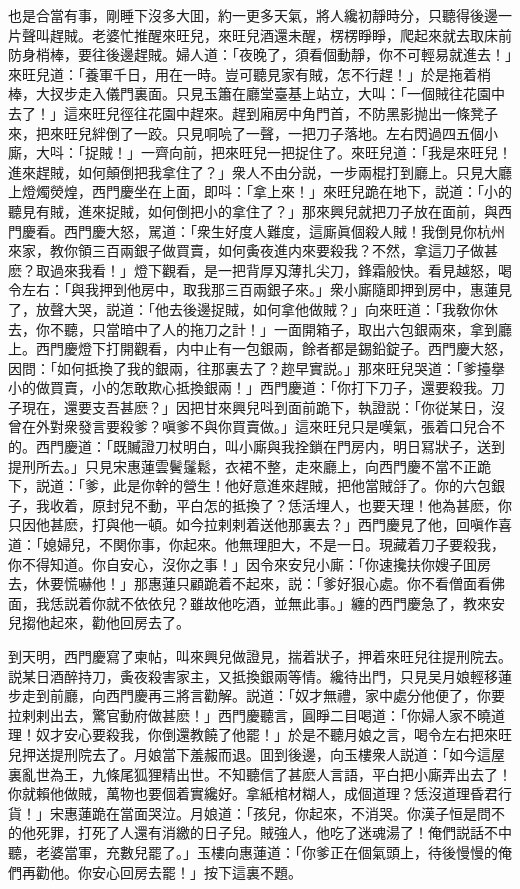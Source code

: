也是合當有事，剛睡下沒多大囬，約一更多天氣，將人纔初靜時分，只聽得後邊一片聲叫趕賊。老婆忙推醒來旺兒，來旺兒酒還未醒，楞楞睜睜，爬起來就去取床前防身梢棒，要往後邊趕賊。婦人道：「夜晚了，須看個動靜，你不可輕易就進去！」來旺兒道：「養軍千日，用在一時。豈可聽見家有賊，怎不行趕！」於是拖着梢棒，大扠步走入儀門裏面。只見玉簫在廳堂臺基上站立，大叫：「一個賊往花園中去了！」這來旺兒徑往花園中趕來。趕到廂房中角門首，不防黑影抛出一條凳子來，把來旺兒絆倒了一跤。只見哃喨了一聲，一把刀子落地。左右閃過四五個小廝，大呌：「捉賊！」一齊向前，把來旺兒一把捉住了。來旺兒道：「我是來旺兒！進來趕賊，如何顛倒把我拿住了？」衆人不由分説，一步兩棍打到廳上。只見大廳上燈燭熒煌，西門慶坐在上面，即呌：「拿上來！」來旺兒跪在地下，説道：「小的聽見有賊，進來捉賊，如何倒把小的拿住了？」那來興兒就把刀子放在面前，與西門慶看。西門慶大怒，駡道：「衆生好度人難度，這廝眞個殺人賊！我倒見你杭州來家，教你領三百兩銀子做買賣，如何夤夜進内來要殺我？不然，拿這刀子做甚麽？取過來我看！」燈下觀看，是一把背厚刄薄扎尖刀，鋒霜般快。看見越怒，喝令左右：「與我押到他房中，取我那三百兩銀子來。」衆小廝隨即押到房中，惠蓮見了，放聲大哭，説道：「他去後邊捉賊，如何拿他做賊？」向來旺道：「我敎你休去，你不聽，只當暗中了人的拖刀之計！」一面開箱子，取出六包銀兩來，拿到廳上。西門慶燈下打開觀看，内中止有一包銀兩，餘者都是錫鉛錠子。西門慶大怒，因問：「如何抵換了我的銀兩，往那裏去了？趂早實説。」那來旺兒哭道：「爹擡擧小的做買賣，小的怎敢欺心抵換銀兩！」西門慶道：「你打下刀子，還要殺我。刀子現在，還要支吾甚麽？」因把甘來興兒呌到面前跪下，執證説：「你従某日，沒曾在外對衆發言要殺爹？嗔爹不與你買賣做。」這來旺兒只是嘆氣，張着口兒合不的。西門慶道：「既贓證刀杖明白，叫小廝與我拴鎖在門房内，明日冩狀子，送到提刑所去。」只見宋惠蓮雲鬢鬔鬆，衣裙不整，走來廳上，向西門慶不當不正跪下，説道：「爹，此是你幹的營生！他好意進來趕賊，把他當賊㧱了。你的六包銀子，我收着，原封兒不動，平白怎的抵換了？恁活埋人，也要天理！他為甚麽，你只因他甚麽，打與他一頓。如今拉剌剌着送他那裏去？」西門慶見了他，回嗔作喜道：「媳婦兒，不関你事，你起來。他無理胆大，不是一日。現藏着刀子要殺我，你不得知道。你自安心，沒你之事！」因令來安兒小廝：「你速攙扶你嫂子囬房去，休要慌嚇他！」那惠蓮只顧跪着不起來，説：「爹好狠心處。你不看僧面看佛面，我恁説着你就不依依兒？雖故他吃酒，並無此事。」纏的西門慶急了，教來安兒搊他起來，勸他回房去了。

到天明，西門慶寫了柬帖，叫來興兒做證見，揣着狀子，押着來旺兒往提刑院去。説某日酒醉持刀，夤夜殺害家主，又抵換銀兩等情。纔待出門，只見吴月娘輕移蓮步走到前廳，向西門慶再三將言勸解。説道：「奴才無禮，家中處分他便了，你要拉剌剌出去，驚官動府做甚麽！」西門慶聽言，圓睜二目喝道：「你婦人家不曉道理！奴才安心要殺我，你倒還教饒了他罷！」於是不聽月娘之言，喝令左右把來旺兒押送提刑院去了。月娘當下羞赧而退。囬到後邊，向玉樓衆人説道：「如今這屋裏亂世為王，九條尾狐狸精出世。不知聽信了甚麽人言語，平白把小廝弄出去了！你就賴他做賊，萬物也要個着實纔好。拿紙棺材糊人，成個道理？恁沒道理昏君行貨！」宋惠蓮跪在當面哭泣。月娘道：「孩兒，你起來，不消哭。你漢子恒是問不的他死罪，打死了人還有消繳的日子兒。賊強人，他吃了迷魂湯了！俺們説話不中聽，老婆當軍，充數兒罷了。」玉樓向惠蓮道：「你爹正在個氣頭上，待後慢慢的俺們再勸他。你安心回房去罷！」按下這裏不題。

